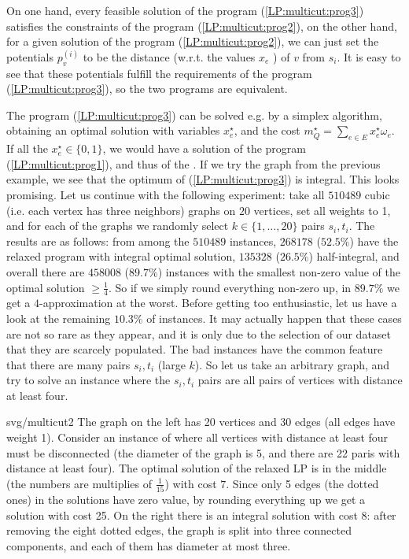 \noindent
On one hand, every feasible solution of the program  (\ref{LP:multicut:prog3}) satisfies the constraints
of the program  (\ref{LP:multicut:prog2}), on the other hand, for a given solution of the program
(\ref{LP:multicut:prog2}), we can just set the potentials  $p_{v}^{(i)}$ to be the distance (w.r.t. the values $x_e$ )
of $v$ from $s_i$. It is easy to see that these potentials fulfill the requirements of the program 
 (\ref{LP:multicut:prog3}), so the two programs are equivalent.



\noindent
The program (\ref{LP:multicut:prog3}) can be solved e.g. by a simplex algorithm, obtaining an optimal solution
with variables  $x_e^\star$, and the cost $m_Q^\star=\sum_{e\in E}x_e^\star\omega_e$.
If all the $x_e^\star\in\{0,1\}$, we would have a solution of the program (\ref{LP:multicut:prog1}), and thus
of the \minmulticut. If we try the graph from the previous example, we see that the optimum of  
(\ref{LP:multicut:prog3}) is integral. This looks promising. Let us continue with the following experiment:
take all  $510 489$ cubic (i.e. each vertex has three neighbors) graphs on $20$ vertices, set all weights to 1, and
for each of the graphs we randomly select $k\in\{1,\ldots,20\}$ pairs $s_i, t_i$. The results 
are as follows: from among the  $510 489$ instances, $268 178$ ($52.5\%$) have the relaxed program with integral
optimal solution,  $135 328$ ($26.5\%$) half-integral, and overall there are $458 008$ ($89.7\%$) instances with
the smallest non-zero value of the optimal solution $\ge\frac{1}{4}$.
So if we simply round everything non-zero up, in $89.7\%$ we get a $4$-approximation at the worst. 
Before getting too enthusiastic, let us have a look at the remaining  $10.3\%$ of instances. It may actually 
happen that these cases are not so rare as they appear, and it is only due to the selection of our dataset that
they are scarcely populated. The bad instances have the common feature that there are many pairs  $s_i,t_i$ 
(large $k$).  So let us take an arbitrary graph, and try to solve an instance where the $s_i,t_i$ pairs are all
pairs of vertices with distance at least four.


\begin{myfig}{\textwidth}{svg/multicut2}
  The graph on the left has 20 vertices and 30 edges (all edges have weight 1). Consider an instance
  of \minmulticut where all vertices with distance at least four must be disconnected (the diameter of the graph
  is 5, and there are 22 paris with distance at least four). The optimal solution of the relaxed LP
  is in the middle (the numbers are multiplies of $\frac{1}{15}$) with cost $7$. Since only 5 edges (the dotted ones)
  in the solutions have zero value, by rounding everything up we get a solution with cost 25. On the right there is
  an integral solution with cost 8: after removing the eight dotted edges, the graph is split into three connected 
  components, and each of them has diameter at most three.
\end{myfig}



